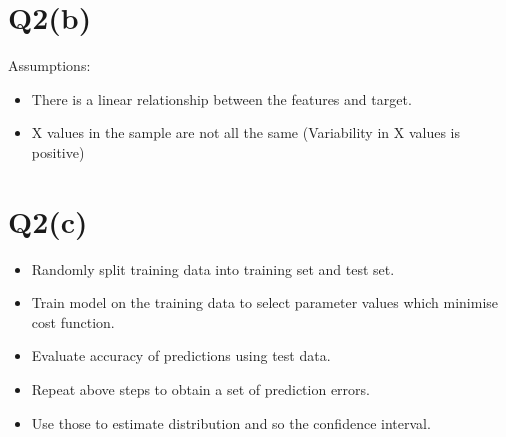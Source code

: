 \documentclass{article}
\begin{document}
        \section*{Q2(b)}
            Assumptions:
            \begin{itemize}
                \item There is a linear relationship between the features and target.
                \item X values in the sample are not all the same (Variability in X values is positive)
            \end{itemize}
        
        \section*{Q2(c)}
            \begin{itemize}
                \item Randomly split training data into training set and test set.
                \item Train model on the training data to select parameter values which minimise cost function.
                \item Evaluate accuracy of predictions using test data.
                \item Repeat above steps to obtain a set of prediction errors.
                \item Use those to estimate distribution and so the confidence interval.
            \end{itemize}
    
\end{document}
